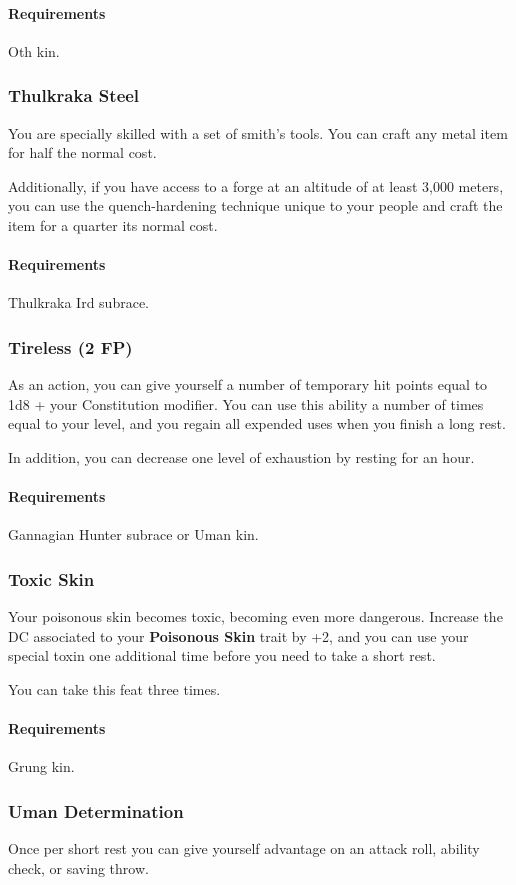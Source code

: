     \paragraph{Requirements} Oth kin.
\subsubsection{Thulkraka Steel} \label{feat::thulkrakasteel}
    You are specially skilled with a set of smith's tools.
    You can craft any metal item for half the normal cost.

    Additionally, if you have access to a forge at an altitude of at least 3,000 meters, you can use the quench-hardening technique unique to your people and craft the item for a quarter its normal cost.
    \paragraph{Requirements} Thulkraka Ird subrace.
\subsubsection{Tireless (2 FP)} \label{feat::tireless}
    As an action, you can give yourself a number of temporary hit points equal to 1d8 + your Constitution modifier.
    You can use this ability a number of times equal to your level, and you regain all expended uses when you finish a long rest.

    In addition, you can decrease one level of exhaustion by resting for an hour.
    \paragraph{Requirements} Gannagian Hunter subrace or Uman kin.
\subsubsection{Toxic Skin} \label{feat::toxicskin}
    Your poisonous skin becomes toxic, becoming even more dangerous.
    Increase the DC associated to your \textbf{Poisonous Skin} trait by +2, and you can use your special toxin one additional time before you need to take a short rest.

    You can take this feat three times.
    \paragraph{Requirements} Grung kin.
\subsubsection{Uman Determination} \label{feat::umandetermination}
    Once per short rest you can give yourself advantage on an attack roll, ability check, or saving throw.

